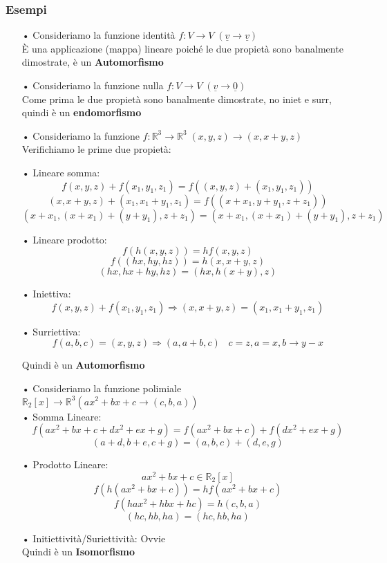 \subsubsection{Esempi}
\begin{itemize}
\item[•] Consideriamo la funzione identità $f: V \rightarrow V \; (\underline{v} \rightarrow \underline{v})$\\
È una applicazione (mappa) lineare poiché le due propietà sono banalmente dimostrate, è un \textbf{Automorfismo}

\item[•] Consideriamo la funzione nulla $f: V \rightarrow V \; (\underline{v} \rightarrow \underline{0})$\\
Come prima le due propietà sono banalmente dimostrate, no iniet e surr, quindi è un \textbf{endomorfismo}

\item[•] Consideriamo la funzione $f: \mathbb{R}^3 \rightarrow \mathbb{R}^3 \; (x,y,z) \rightarrow (x,x+y,z)$\\
Verifichiamo le prime due propietà:

\subitem • Lineare somma:
$$ f(x,y,z)+f(x_1,y_1,z_1) = f((x,y,z)+(x_1,y_1,z_1)) $$
$$ (x,x+y,z)+(x_1,x_1+y_1,z_1) = f((x+x_1,y+y_1,z+z_1))$$
$$ (x+x_1,(x+x_1)+(y+y_1),z+z_1) = (x+x_1,(x+x_1)+(y+y_1),z+z_1) $$

\subitem • Lineare prodotto:
$$ f(h(x,y,z)) = hf(x,y,z)$$
$$ f((hx,hy,hz)) = h(x,x+y,z)$$
$$ (hx,hx+hy,hz) = (hx,h(x+y),z)$$

\subitem • Iniettiva:
$$ f(x,y,z) + f(x_1,y_1,z_1) \Rightarrow (x,x+y,z) = (x_1,x_1+y_1,z_1) $$

\subitem • Surriettiva:
$$ f(a,b,c) = (x,y,z) \Rightarrow (a,a+b,c) \; \;\; c=z, a=x, b \rightarrow y-x$$

Quindi è un \textbf{Automorfismo}

\item[•] Consideriamo la funzione polimiale $\mathbb{R}_2[x] \rightarrow \mathbb{R}^3 (ax^2+bx+c \rightarrow (c,b,a))$\\

\subitem • Somma Lineare:
$$ f(ax^2+bx+c + dx^2+ex+g) = f(ax^2+bx+c) + f(dx^2+ex+g)  $$
$$ (a+d,b+e,c+g) = (a,b,c)+(d,e,g)$$

\subitem • Prodotto Lineare:
$$ ax^2+bx+c \in \mathbb{R}_2[x] $$
$$ f(h(ax^2+bx+c)) = hf(ax^2+bx+c)$$
$$ f(hax^2+hbx+hc) = h(c,b,a)$$
$$ (hc,hb,ha) = (hc,hb,ha)$$

\subitem • Initiettività/Suriettività: Ovvie\\
Quindi è un \textbf{Isomorfismo}


\end{itemize}
